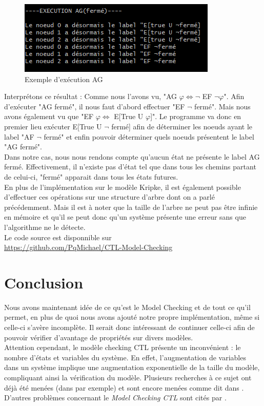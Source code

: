 \documentclass[runningheads,a4paper]{llncs}
\begin{document}
\begin{figure}[!h]
	\includegraphics[scale=0.8]{executionExemple.png}
	\centering
	\caption{Exemple d'exécution AG}
	\label{label-image9}
\end{figure}

\noindent Interprétons ce résultat : Comme nous l'avons vu, "AG $\varphi \Leftrightarrow \lnot$ EF $\lnot \varphi$". Afin d'exécuter "AG fermé", il nous faut d'abord effectuer "EF $\lnot$ fermé". Mais nous avons également vu que "EF $\varphi \Leftrightarrow$ E[True U $\varphi$]". Le programme va donc en premier lieu exécuter E[True U $\lnot$ fermé] afin de déterminer les noeuds ayant le label "AF $\lnot$ fermé" et enfin pouvoir déterminer quels noeuds présentent le label "AG fermé".\\
\noindent Dans notre cas, nous nous rendons compte qu'aucun état ne présente le label AG fermé. Effectivement, il n'existe pas d'état tel que dans tous les chemins partant de celui-ci, "fermé" apparait dans tous les états futures.\\

\noindent En plus de l'implémentation sur le modèle Kripke, il est également possible d'effectuer ces opérations sur une structure d'arbre dont on a parlé précédemment. Mais il est à noter que la taille de l'arbre ne peut pas être infinie en mémoire et qu'il se peut donc qu'un système présente une erreur sans que l'algorithme ne le détecte. \\

\noindent Le code source est disponnible sur \\ \url{https://github.com/PqMichael/CTL-Model-Checking}

\section{Conclusion}

Nous avons maintenant idée de ce qu'est le Model Checking et de tout ce qu'il permet, en plus de quoi nous avons ajouté notre propre implémentation, même si celle-ci s'avère incomplète. Il serait donc intéressant de continuer celle-ci afin de pouvoir vérifier d'avantage de propriétés sur divers modèles. \\

\noindent Attention cependant, le modèle checking CTL présente un inconvénient : le nombre d'états et variables du système. En effet, l'augmentation de variables dans un système implique une augmentation exponentielle de la taille du modèle, compliquant ainsi la vérification du modèle.
Plusieurs recherches à ce sujet ont déjà été menées (dans \cite{a2} par exemple) et sont encore menées comme dit dans \cite{a1}.\\
D'autres problèmes concernant le \textit{Model Checking CTL} sont cités par \citep{a3}.

{}

\end{document}
